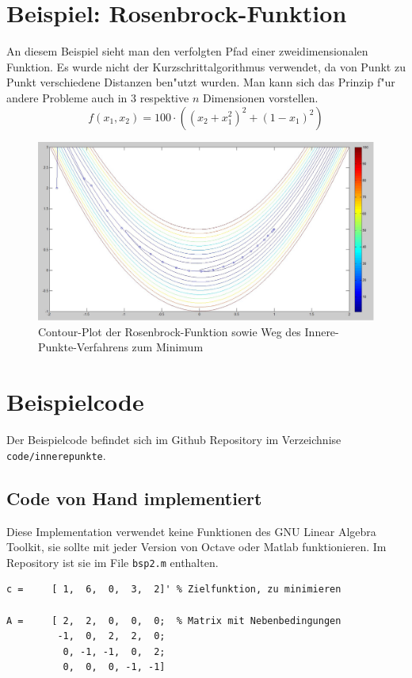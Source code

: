 \begin{refsection}
\section{Beispiel: Rosenbrock-Funktion}
An diesem Beispiel sieht man den verfolgten Pfad einer zweidimensionalen
Funktion. Es wurde nicht der Kurzschrittalgorithmus verwendet, da von
Punkt zu Punkt verschiedene Distanzen ben"utzt wurden. Man kann sich
das Prinzip f"ur andere Probleme auch in $3$ respektive $n$ Dimensionen
vorstellen.
\[
f(x_1, x_2) = 100 \cdot ((x_2+x_1^2)^2 + (1-x_1)^2)
\]
\begin{figure}
\begin{center}
\includegraphics[width=\hsize]{./innerepunkte/Rosen.pdf}
\end{center}
\caption{Contour-Plot der Rosenbrock-Funktion sowie Weg des
Innere-Punkte-Verfahrens zum Minimum}
\end{figure}

\section{Beispielcode}
Der Beispielcode befindet sich im Github Repository im Verzeichnise
{\tt code/innerepunkte}.

\subsection{Code von Hand implementiert}
Diese Implementation verwendet keine Funktionen des GNU Linear Algebra
Toolkit, sie sollte mit jeder Version von Octave oder Matlab funktionieren.
Im Repository ist sie im File {\tt bsp2.m} enthalten.
\begin{lstlisting}[style=Matlab]
c =     [ 1,  6,  0,  3,  2]' % Zielfunktion, zu minimieren

A =     [ 2,  2,  0,  0,  0;  % Matrix mit Nebenbedingungen
         -1,  0,  2,  2,  0;
          0, -1, -1,  0,  2;
          0,  0,  0, -1, -1]


\end{lstlisting}
\end{refsection}
